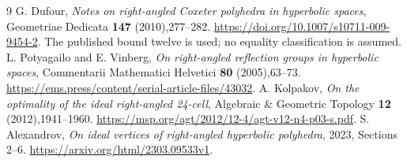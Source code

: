\documentclass[11pt]{article}
\begin{document}
\begin{thebibliography}{9}
 G. Dufour,
\emph{Notes on right-angled Coxeter polyhedra in hyperbolic spaces},
Geometriae Dedicata \textbf{147} (2010),277--282.
\url{https://doi.org/10.1007/s10711-009-9454-2}.
The published bound twelve is used; no equality classification is assumed.
 L. Potyagailo and E. Vinberg,
\emph{On right-angled reflection groups in hyperbolic spaces},
Commentarii Mathematici Helvetici \textbf{80} (2005),63--73.
\url{https://ems.press/content/serial-article-files/43032}.
 A. Kolpakov,
\emph{On the optimality of the ideal right-angled 24-cell},
Algebraic \& Geometric Topology \textbf{12} (2012),1941--1960.
\url{https://msp.org/agt/2012/12-4/agt-v12-n4-p03-s.pdf}.
 S. Alexandrov,
\emph{On ideal vertices of right-angled hyperbolic polyhedra},
2023, Sections 2--6.
\url{https://arxiv.org/html/2303.09533v1}.
\end{thebibliography}
\end{document}
